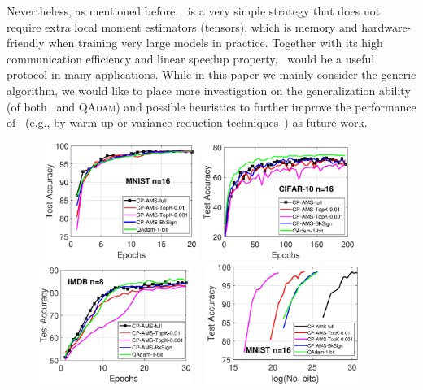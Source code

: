 \documentclass[11pt]{article}
\begin{document}
Nevertheless, as mentioned before, \algo\ is a very simple strategy that does not require extra local moment estimators (tensors), which is memory and hardware-friendly when training very large models in practice. 
Together with its high communication efficiency and linear speedup property, \algo\ would be a useful protocol in many applications. While in this paper we mainly consider the generic algorithm, we would like to place more investigation on the generalization ability (of both \algo\ and \textsc{QAdam}) and possible heuristics to further improve the performance of \algo\ (e.g., by warm-up or variance reduction techniques~\cite{Proc:Liu_ICLR20}) as future work.


\begin{figure}[h]
    \begin{center}
    \mbox{\hspace{-0.1in}
        \includegraphics[width=1.95in]{fig/mnist_cnn_test_accuracy_16_Qadamsign.eps}\hspace{-0.1in}
        \includegraphics[width=1.95in]{fig/cifar_lenet_test_accuracy_16_Qadamsign.eps}
        \hspace{-0.1in}
        \includegraphics[width=1.95in]{fig/imbd_lstm_test_accuracy_8_Qadamsign_tk001.eps}
    }
    \mbox{\hspace{-0.1in}
        \includegraphics[width=1.95in]{fig/mnist_cnn_test_accuracy_16_vs_bits_Qadamsign.eps}\hspace{-0.1in}
}
\end{center}
\end{figure}
\end{document}
